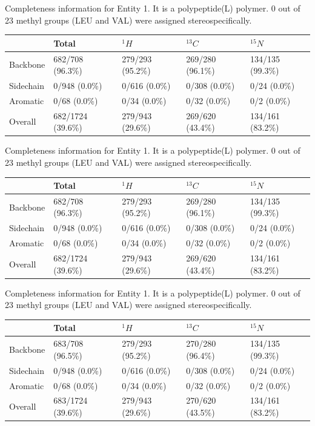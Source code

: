 Completeness information for Entity 1. It is a polypeptide(L) polymer. 0 out of 23 methyl groups (LEU and VAL) were assigned stereospecifically.\begin{longtable}{|l|l|l|l|l|}
\hline
  & Total & $^{1}H$ & $^{13}C$ & $^{15}N$\\\hline
Backbone & 682/708 (96.3\%)& 279/293 (95.2\%)& 269/280 (96.1\%)& 134/135 (99.3\%) \\
\hline
Sidechain & 0/948 (0.0\%)& 0/616 (0.0\%)& 0/308 (0.0\%)& 0/24 (0.0\%) \\
\hline
Aromatic & 0/68 (0.0\%)& 0/34 (0.0\%)& 0/32 (0.0\%)& 0/2 (0.0\%) \\
\hline
Overall & 682/1724 (39.6\%)& 279/943 (29.6\%)& 269/620 (43.4\%)& 134/161 (83.2\%) \\
\hline
\end{longtable}
Completeness information for Entity 1. It is a polypeptide(L) polymer. 0 out of 23 methyl groups (LEU and VAL) were assigned stereospecifically.\begin{longtable}{|l|l|l|l|l|}
\hline
  & Total & $^{1}H$ & $^{13}C$ & $^{15}N$\\\hline
Backbone & 682/708 (96.3\%)& 279/293 (95.2\%)& 269/280 (96.1\%)& 134/135 (99.3\%) \\
\hline
Sidechain & 0/948 (0.0\%)& 0/616 (0.0\%)& 0/308 (0.0\%)& 0/24 (0.0\%) \\
\hline
Aromatic & 0/68 (0.0\%)& 0/34 (0.0\%)& 0/32 (0.0\%)& 0/2 (0.0\%) \\
\hline
Overall & 682/1724 (39.6\%)& 279/943 (29.6\%)& 269/620 (43.4\%)& 134/161 (83.2\%) \\
\hline
\end{longtable}
Completeness information for Entity 1. It is a polypeptide(L) polymer. 0 out of 23 methyl groups (LEU and VAL) were assigned stereospecifically.\begin{longtable}{|l|l|l|l|l|}
\hline
  & Total & $^{1}H$ & $^{13}C$ & $^{15}N$\\\hline
Backbone & 683/708 (96.5\%)& 279/293 (95.2\%)& 270/280 (96.4\%)& 134/135 (99.3\%) \\
\hline
Sidechain & 0/948 (0.0\%)& 0/616 (0.0\%)& 0/308 (0.0\%)& 0/24 (0.0\%) \\
\hline
Aromatic & 0/68 (0.0\%)& 0/34 (0.0\%)& 0/32 (0.0\%)& 0/2 (0.0\%) \\
\hline
Overall & 683/1724 (39.6\%)& 279/943 (29.6\%)& 270/620 (43.5\%)& 134/161 (83.2\%) \\
\hline
\end{longtable}
